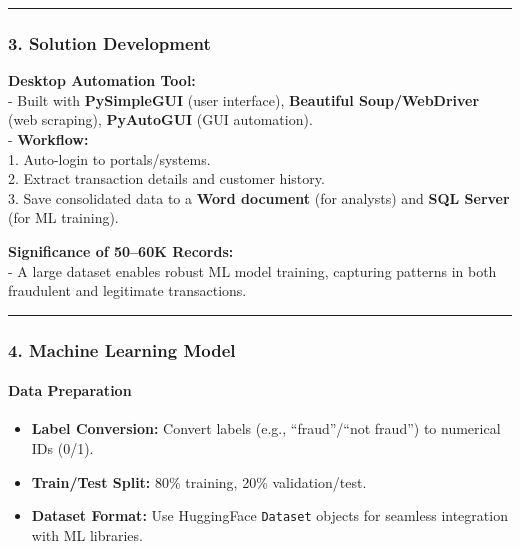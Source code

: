 \documentclass[
]{article}
\providecommand{\tightlist}{%
  \setlength{\itemsep}{0pt}\setlength{\parskip}{0pt}}
\begin{document}
\begin{center}\rule{0.5\linewidth}{0.5pt}\end{center}

\subsubsection{\texorpdfstring{\textbf{3. Solution
Development}}{3. Solution Development}}\label{solution-development}

\textbf{Desktop Automation Tool:}\\
- Built with \textbf{PySimpleGUI} (user interface), \textbf{Beautiful
Soup/WebDriver} (web scraping), \textbf{PyAutoGUI} (GUI automation).\\
- \textbf{Workflow:}\\
1. Auto-login to portals/systems.\\
2. Extract transaction details and customer history.\\
3. Save consolidated data to a \textbf{Word document} (for analysts) and
\textbf{SQL Server} (for ML training).

\textbf{Significance of 50--60K Records:}\\
- A large dataset enables robust ML model training, capturing patterns
in both fraudulent and legitimate transactions.

\begin{center}\rule{0.5\linewidth}{0.5pt}\end{center}

\subsubsection{\texorpdfstring{\textbf{4. Machine Learning
Model}}{4. Machine Learning Model}}\label{machine-learning-model}

\paragraph{\texorpdfstring{\textbf{Data
Preparation}}{Data Preparation}}\label{data-preparation}

\begin{itemize}
\tightlist
\item
  \textbf{Label Conversion:} Convert labels (e.g., ``fraud''/``not
  fraud'') to numerical IDs (0/1).\\
\item
  \textbf{Train/Test Split:} 80\% training, 20\% validation/test.\\
\item
  \textbf{Dataset Format:} Use HuggingFace \texttt{Dataset} objects for
  seamless integration with ML libraries.
\end{itemize}
\end{document}
